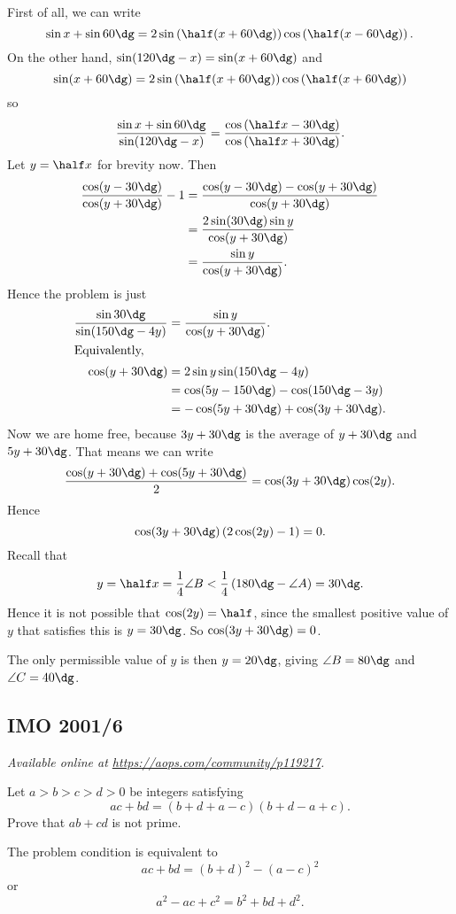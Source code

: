 \documentclass[11pt]{scrartcl}
\begin{document}
First of all, we can write
\[ \sin x + \sin 60\dg
  = 2\sin \left( \half (x+60\dg) \right)
  \cos \left( \half (x-60\dg) \right). \]
On the other hand, $\sin (120\dg - x) = \sin(x+60\dg)$ and
\[ \sin (x+60\dg)
  = 2 \sin \left( \half (x+60\dg) \right)
  \cos \left( \half(x+60\dg) \right) \]
so
\[ \frac{\sin x + \sin 60\dg}{\sin (120\dg - x)}
  = \frac{\cos \left( \half x - 30\dg \right)}%
  {\cos \left( \half x + 30\dg \right)}. \]
Let $y = \half x$ for brevity now. Then
\begin{align*}
  \frac{\cos(y-30\dg)}{\cos(y+30\dg)} - 1
  &= \frac{\cos(y-30\dg)-\cos(y+30\dg)}{\cos(y+30\dg)} \\
  &= \frac{2 \sin (30\dg) \sin y}{\cos(y+30\dg)} \\
  &= \frac{\sin y}{\cos (y+30\dg)}.
\end{align*}
Hence the problem is just
\begin{align*}
  \frac{\sin 30\dg}{\sin(150\dg - 4y)} &= \frac{\sin y}{\cos(y+30\dg)}. \\
  \intertext{Equivalently,}
  \cos(y+30\dg) &= 2\sin y \sin (150\dg -4y) \\
  &= \cos(5y-150\dg) - \cos(150\dg-3y) \\
  &= -\cos(5y+30\dg) + \cos(3y+30\dg).
\end{align*}
Now we are home free, because $3y+30\dg$
is the average of $y+30\dg$ and $5y+30\dg$.
That means we can write
\[ \frac{\cos(y+30\dg)+\cos(5y+30\dg)}{2} = \cos(3y+30\dg) \cos(2y). \]
Hence
\[ \cos(3y+30\dg) \left( 2\cos(2y)-1 \right) = 0. \]
Recall that
\[ y = \half x = \frac 14 \angle B
  < \frac 14 \left( 180\dg - \angle A \right) = 30\dg. \]
Hence it is not possible that $\cos(2y) = \half$,
since the smallest positive value of $y$
that satisfies this is $y=30\dg$.
So $\cos (3y+30\dg) = 0$.

The only permissible value of $y$ is then $y = 20\dg$,
giving $\angle B = 80\dg$ and $\angle C = 40\dg$.
\pagebreak

\subsection{IMO 2001/6}
\textsl{Available online at \url{https://aops.com/community/p119217}.}
\begin{mdframed}[style=mdpurplebox,frametitle={Problem statement}]
Let $a > b > c > d > 0$ be integers satisfying
\[ ac + bd = (b+d+a-c)(b+d-a+c).  \]
Prove that $ab + cd$ is not prime.
\end{mdframed}
The problem condition is equivalent to
\[ ac + bd = (b+d)^2 - (a-c)^2 \]
or
\[ a^2-ac+c^2 = b^2+bd+d^2. \]
\end{document}
